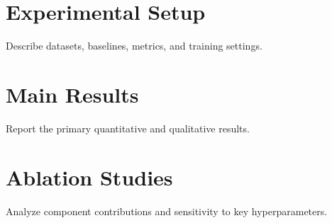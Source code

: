 \section{Experimental Setup}

Describe datasets, baselines, metrics, and training settings.

\section{Main Results}

Report the primary quantitative and qualitative results.

\section{Ablation Studies}

Analyze component contributions and sensitivity to key hyperparameters.
